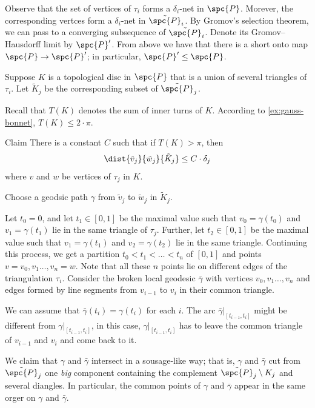 Observe that the set of vertices of $\tau_i$ forms a $\delta_i$-net in $\spc{P}$.
Morever, the corresponding vertces form a $\delta_i$-net in $\tilde{\spc{P}}_i$.
By Gromov's selection theorem, we can pass to a converging subsequence of $\tilde{\spc{P}}_i$.
Denote its Gromov--Hausdorff limit by $\spc{P}'$.
From above we have that there is a short onto map $\spc{P}\to \spc{P}'$;
in particular, $\spc{P}'\le \spc{P}$.

Suppose $K$ is a topological disc in $\spc{P}$ that is a union of several triangles of $\tau_i$.
Let $\tilde K_j$ be the corresponding subset of $\tilde{\spc{P}}_j$.




Recall that $T(K)$ denotes the sum of inner turns of $K$.
According to \ref{ex:gauss-bonnet}, $T(K)\le 2\cdot\pi$.

\begin{thm}{Claim}
There is a constant $C$ such that if $T(K)>\pi$, then
\[\dist{\tilde v_j}{\tilde w_j}{\tilde K_j}\le C\cdot\delta_j\]
where $v$ and $w$ be vertices of $\tau_j$ in $K$.
\end{thm}

Choose a geodsic path $\gamma$ from $\tilde v_j$ to $\tilde w_j$ in $\tilde K_j$.

Let $t_0=0$, and let $t_1\in[0,1]$ be the maximal value such that $v_0=\gamma(t_0)$ and $v_1=\gamma(t_1)$ lie in the same triangle of $\tau_j$.
Further, let $t_2\in[0,1]$ be the maximal value such that $v_1=\gamma(t_1)$ and $v_2=\gamma(t_2)$ lie in the same triangle.
Continuing this process, we get a partition $t_0<t_1<\dots<t_n$ of $[0,1]$ and points $v=v_0,v_1\dots,v_n=w$.
Note that all these $n$ points lie on different edges of the triangulation $\tau_i$.
Consider the broken local geodesic $\bar\gamma$ with vertices $v_0,v_1\dots,v_n$ and edges formed by line segments from $v_{i-1}$ to $v_i$ in their common triangle.

We can assume that $\bar\gamma(t_i)=\gamma(t_i)$ for each $i$.
The arc $\bar\gamma|_{[t_{i-1},t_i]}$ might be different from $\gamma|_{[t_{i-1},t_i]}$,
in this case, $\gamma|_{[t_{i-1},t_i]}$ has to leave the common triangle of $v_{i-1}$ and $v_i$ and come back to it.

We claim that $\gamma$ and $\bar\gamma$ intersect in a sousage-like way;
that is, $\gamma$ and $\bar\gamma$ cut from $\tilde{\spc{P}}_j$ one \textit{big} component containing the complement $\tilde{\spc{P}}_j\setminus K_j$ and several diangles.
In particular, the common points of $\gamma$ and $\bar\gamma$ appear in the same orger on $\gamma$ and $\bar\gamma$.

